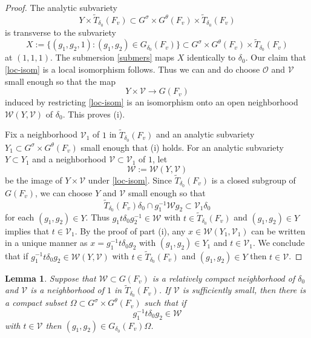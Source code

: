 \documentclass[12pt]{amsart}
\newtheorem{lem}[thm]{Lemma}
\theoremstyle{remark}
\numberwithin{equation}{section}
\newcommand{\lto}{\longrightarrow}
\newcommand{\OO}{\mathcal{O}}
\newcommand{\quash}[1]{}
\theoremstyle{definition}
\numberwithin{equation}{subsection}
\begin{document}
\begin{proof}
The analytic subvariety
$$
Y \times \widetilde{T}_{\delta_0}(F_v) \subset
G^{\sigma} \times G^{\theta}(F_v) \times \widetilde{T}_{\delta_0}(F_v)
$$
is transverse to the subvariety
$$
X:=\{(g_1,g_2,1):(g_1,g_2) \in G_{\delta_0}(F_v)\} \subset
G^{\sigma} \times G^{\theta}(F_v) \times \widetilde{T}_{\delta_0}(F_v)
$$
at $(1,1,1)$.
The submersion \eqref{submers} maps $X$ identically to $\delta_0$. Our claim that \eqref{loc-isom} is a local
isomorphism follows.  Thus we can and do choose $\OO$ and $\mathcal{V}$ small enough so that the map
$$
Y \times \mathcal{V} \lto G(F_v)
$$
induced by restricting \eqref{loc-isom} is an isomorphism onto an open neighborhood $\mathcal{W}(Y,\mathcal{V})$ of
$\delta_0$.  This proves (i).

Fix a neighborhood $\mathcal{V}_1$ of $1$ in $\widetilde{T}_{\delta_0}(F_v)$ and an analytic subvariety $Y_1 \subset
G^{\sigma}  \times G^{\theta}(F_v)$ small enough that (i) holds.
For an analytic subvariety $Y \subset Y_1$ and a neighborhood
$\mathcal{V} \subset \mathcal{V}_1$ of $1$, let
$$
\mathcal{W}:=\mathcal{W}(Y,\mathcal{V})
$$ be the image of $Y \times
\mathcal{V}$ under \eqref{loc-isom}.  Since
$\widetilde{T}_{\delta_0}(F_v)$ is a closed subgroup of $G(F_v)$, we can choose $Y$ and $\mathcal{V}$
small enough so that
$$
\widetilde{T}_{\delta_0}(F_v) \delta_0 \cap g_1^{-1}\mathcal{W}g_2 \subset \mathcal{V}_1\delta_0
$$
for each $(g_1,g_2) \in Y$. \quash{Choose an open set $V \subset G(F_v)$ such that $V \cap \widetilde{T}_{\delta_0}(F_v)\delta_0=\mathcal{V}_1\delta_0$.
 Just let $Y \times Y \times \mathcal{V}$ be the inverse image of the open set $V$ under the map $(g_1,g_2,g_3,g_4,t) \mapsto g_1^{-1}g_3^{-1}t\delta_0g_4g_2$} Thus $g_1t\delta_0g_2^{-1} \in \mathcal{W}$ with $t \in \widetilde{T}_{\delta_0}(F_v)$ and $(g_1,g_2) \in Y$
implies that $t \in \mathcal{V}_1$.  By the proof of part (i), any $x \in \mathcal{W}(Y_1,\mathcal{V}_1)$ can be
written in a unique manner as $x=g_1^{-1}t\delta_0g_2$ with $(g_1,g_2) \in Y_1$ and
$t \in \mathcal{V}_1$.
We conclude that if $g_1^{-1}t\delta_0g_2 \in \mathcal{W}(Y,\mathcal{V})$ with $t \in
\widetilde{T}_{\delta_0}(F_v)$ and $(g_1,g_2) \in Y$ then $t \in \mathcal{V}$.
\end{proof}

\begin{lem} \label{lem-compact}
Suppose that $\mathcal{W} \subset G(F_v)$ is a relatively compact
neighborhood of $\delta_0$ and $\mathcal{V}$ is a neighborhood of $1$ in
$\widetilde{T}_{\delta_0}(F_v)$.  If $\mathcal{V}$ is sufficiently small, then there is a
compact subset $\Omega \subset G^{\sigma} \times G^{\theta}(F_v)$ such that if
$$
g_1^{-1}t\delta_0 g_2 \in \mathcal{W}
$$
with $t \in \mathcal{V}$ then $(g_1,g_2) \in G_{\delta_0}(F_v)\Omega$.
\end{lem}
\end{document}
